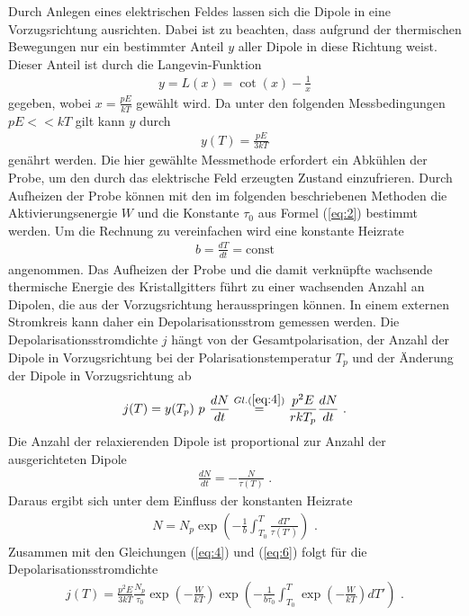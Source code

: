 \noindent
Durch Anlegen eines elektrischen Feldes lassen sich die Dipole in eine Vorzugsrichtung ausrichten.
Dabei ist zu beachten, dass aufgrund der thermischen Bewegungen nur ein bestimmter Anteil $y$ aller Dipole in diese Richtung weist.
Dieser Anteil ist durch die Langevin-Funktion 
\begin{align}
y=L(x)=\cot (x) -\frac{1}{x}
\label{eq:3}
\end{align}
gegeben, wobei $x=\frac{pE}{kT}$ gewählt wird.
Da unter den folgenden Messbedingungen $pE<<kT$ gilt kann $y$ durch
\begin{align}
y(T)=\frac{pE}{3kT}
\label{eq:4}
\end{align}
genährt werden.
Die hier gewählte Messmethode erfordert ein Abkühlen der Probe, um den durch das elektrische Feld erzeugten Zustand einzufrieren.
Durch Aufheizen der Probe können mit den im folgenden beschriebenen Methoden die Aktivierungsenergie $W$ und die Konstante $\tau_0$ aus Formel (\ref{eq:2}) bestimmt werden. 
Um die Rechnung zu vereinfachen wird eine konstante Heizrate
\begin{align}
b=\frac{dT}{dt}=\text{const}
\label{eq:5}
\end{align}
angenommen.
Das Aufheizen der Probe und die damit verknüpfte wachsende thermische Energie des Kristallgitters führt zu einer wachsenden Anzahl an Dipolen, die aus der Vorzugsrichtung herausspringen können.
In einem externen Stromkreis kann daher ein Depolarisationsstrom gemessen werden. 
Die Depolarisationsstromdichte $j$ hängt von der Gesamtpolarisation, der Anzahl der Dipole in Vorzugsrichtung bei der Polarisationstemperatur $T_p$ und der Änderung der Dipole in Vorzugsrichtung ab
\begin{align}
j(T)=y(T_p)~p~\frac{dN}{dt} \overset{Gl. (\ref{eq:4})}{=} \frac{p^2E}{rkT_p}\frac{dN}{dt}\text{ .}
\label{eq:6}
\end{align}
Die Anzahl der relaxierenden Dipole ist proportional zur Anzahl der ausgerichteten Dipole
\begin{align}
\frac{dN}{dt}=-\frac{N}{\tau(T)} \text{ .}
\end{align}
Daraus ergibt sich unter dem Einfluss der konstanten Heizrate
\begin{align}
N=N_p\exp \left(-\frac{1}{b} \int_{T_0}^T \frac{dT\prime}{\tau(T\prime)}\right) \text{ .}
\end{align}
Zusammen mit den Gleichungen (\ref{eq:4}) und (\ref{eq:6}) folgt für die Depolarisationsstromdichte
\begin{align}
j(T)=\frac{p^2E}{3kT}\frac{N_p}{\tau_0}\exp \left(-\frac{W}{kT}\right)\exp\left(-\frac{1}{b\tau_0}\int_{T_0}^T\exp\left(-\frac{W}{kT}\right)dT\prime\right) \text{ .}
\end{align}
